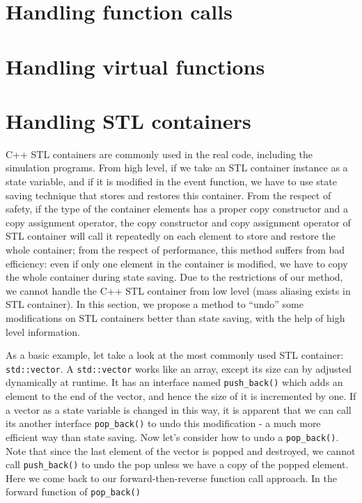 \documentclass[12pt]{gatech-thesis}
\begin{document}
\section{Handling function calls}

\section{Handling virtual functions}

\section{Handling STL containers}

\newcommand{\stlvector}{\texttt{std::vector}\xspace}
\newcommand{\pushback}{\texttt{push_back()}\xspace}
\newcommand{\popback}{\texttt{pop_back()}\xspace}

C++ STL containers are commonly used in the real code, including the simulation programs.
From high level, if we take an STL container instance as a state variable, and if it is modified in the event function, we have to use state saving technique that stores and restores this container.
From the respect of safety, if the type of the container elements has a proper copy constructor and a copy assignment operator,  the copy constructor and copy assignment operator of STL container will call it repeatedly on each element to store and restore the whole container;
from the respect of performance, this method suffers from bad efficiency: even if only one element in the container is modified, we have to copy the whole container during state saving.
Due to the restrictions of our method, we cannot handle the C++ STL container from low level (mass aliasing exists in STL container). 
In this section, we propose a method to ``undo'' some modifications on STL containers better than state saving, with the help of high level information. 


As a basic example, let take a look at the most commonly used STL container: \stlvector. 
A \stlvector works like an array, except its size can by adjusted dynamically at runtime.
It has an interface named \texttt{push\_back()} which adds an element to the end of the vector, and hence the size of it is incremented by one. 
If a vector as a state variable is changed in this way, it is apparent that we can call its another interface \texttt{pop\_back()} to undo this modification -  a much more efficient way than state saving. 
Now let's consider how to undo a \texttt{pop\_back()}. 
Note that since the last element of the vector is popped and destroyed, we cannot call 
\texttt{push\_back()} to undo the pop unless we have a copy of the popped element.
Here we come back to our forward-then-reverse function call approach.
In the forward function of \texttt{pop\_back()}




\end{document}
